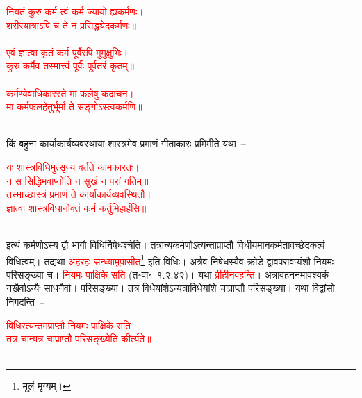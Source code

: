 \centering\textcolor{red}{नियतं कुरु कर्म त्वं कर्म ज्यायो ह्यकर्मणः। \nopagebreak\\
शरीरयात्राऽपि च ते न प्रसिद्ध्येदकर्मणः॥}\nopagebreak\\
\\
\centering\textcolor{red}{एवं ज्ञात्वा कृतं कर्म पूर्वैरपि मुमुक्षुभिः।\nopagebreak\\
कुरु कर्मैव तस्मात्त्वं पूर्वैः पूर्वतरं कृतम्॥}\nopagebreak\\
\\
\centering\textcolor{red}{कर्मण्येवाधिकारस्ते मा फलेषु कदाचन।\nopagebreak\\
मा कर्मफलहेतुर्भूर्मा ते सङ्गोऽस्त्वकर्मणि॥}\nopagebreak\\
\\
\begin{sloppypar}\justifying\noindent\hspace{10mm} किं बहुना कार्याकार्य\-व्यवस्थायां शास्त्रमेव प्रमाणं गीता\-कारः प्रमिमीते यथा~–\end{sloppypar}
\centering\textcolor{red}{यः शास्त्रविधिमुत्सृज्य वर्तते कामकारतः। \nopagebreak\\
न स सिद्धिमवाप्नोति न सुखं न परां गतिम्॥\nopagebreak\\
तस्माच्छास्त्रं प्रमाणं ते कार्याकार्यव्यवस्थितौ।\\
ज्ञात्वा शास्त्रविधानोक्तं कर्म कर्तुमिहार्हसि॥}\nopagebreak\\
\\
\begin{sloppypar}\justifying\noindent\hspace{10mm} इत्थं कर्मणोऽस्य द्वौ भागौ विधिर्निषेधश्चेति। तत्रान्यकर्मणोऽत्यन्ताप्राप्तौ विधीयमान\-कर्मतावच्छेदकत्वं विधित्वम्। तद्यथा \textcolor{red}{अहरहः सन्ध्यामुपासीत}\footnote{मूलं मृग्यम्।} इति विधिः। अत्रैव निषेधस्यैव क्रोडे द्वावपरावप्यंशौ नियमः परिसङ्ख्या च। \textcolor{red}{नियमः पाक्षिके सति} (त॰वा॰~१.२.४२)। यथा \textcolor{red}{व्रीहीनवहन्ति}। अत्रावहननमावश्यकं नखैर्वाऽन्यैः साधनैर्वा। परिसङ्ख्या। तत्र विधेयांशेऽन्यत्राविधेयांशे चाप्राप्तौ परिसङ्ख्या। यथा विद्वांसो निगदन्ति~–\end{sloppypar}
\centering\textcolor{red}{विधिरत्यन्तमप्राप्तौ नियमः पाक्षिके सति। \nopagebreak\\
तत्र चान्यत्र चाप्राप्तौ परिसङ्ख्येति कीर्त्यते॥}\nopagebreak\\
\\
